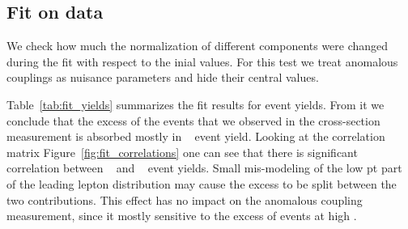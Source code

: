 \subsection{Fit on data}
We check how much the normalization of different components were
changed during the fit with respect to the inial values. For this test
we treat anomalous couplings as nuisance parameters and hide their
central values.

Table~\ref{tab:fit_yields} summarizes the fit results for event
yields. From it we conclude that the excess of the events that we
observed in the cross-section measurement is absorbed mostly in \wjets~
event yield. Looking at the correlation matrix
Figure~\ref{fig:fit_correlations} one can see that there is
significant correlation between \wjets~ and \ww~ event yields. Small
mis-modeling of the low pt part of the leading lepton distribution may
cause the excess to be split between the two contributions. This
effect has no impact on the anomalous coupling measurement, since it
mostly sensitive to the excess of events at high \pt{}.

